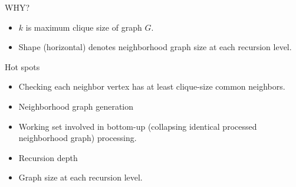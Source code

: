 \documentclass[landscape]{slides}
\begin{document}
\begin{slide}
	\begin{center}{\large WHY?}\end{center}
\end{slide}


\begin{slide}
	\small{
	\begin{itemize}
		\setlength{\itemsep}{0pt}
		\setlength{\parskip}{20pt}
		\setlength{\parsep}{0pt}
		\item $k$ is maximum clique size of graph $G$.
		\item Shape (horizontal) denotes neighborhood graph size at each recursion level.
	\end{itemize}
	}
\end{slide}


\begin{slide}
	\begin{center}{\large Hot spots}\end{center}
	\begin{itemize}
		\setlength{\itemsep}{0pt}
		\setlength{\parskip}{20pt}
		\setlength{\parsep}{0pt}
		\item Checking each neighbor vertex has at least clique-size common neighbors.
		\item Neighborhood graph generation
		\item Working set involved in bottom-up (collapsing identical processed neighborhood graph) processing.
		\item Recursion depth
		\item Graph size at each recursion level.
	\end{itemize}
\end{slide}
\end{document}
